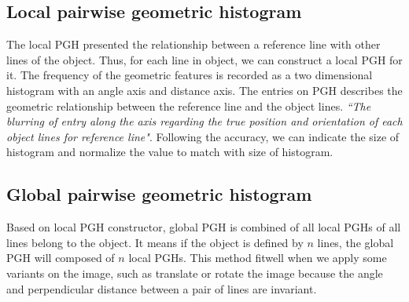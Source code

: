 \subsection{Local pairwise geometric histogram}
The local PGH presented the relationship between a reference line with other lines of the object. Thus, for each line in object, we can construct a local PGH for it. The frequency of the geometric features is recorded as a two dimensional histogram with an angle axis and distance axis. The entries on PGH describes the geometric relationship between the reference line and the object lines. \textit{``The blurring of entry along the axis regarding the true position and orientation of each object lines for reference line"}\cite{palaniswamy2010automatic}. Following the accuracy, we can indicate the size of histogram and normalize the value to match with size of histogram.
\subsection{Global pairwise geometric histogram}
Based on local PGH constructor, global PGH is combined of all local PGHs of all lines belong to the object. It means if the object is defined by $n$ lines, the global PGH will composed of $n$ local PGHs. This method fitwell when we apply some variants on the image, such as translate or rotate the image because the angle and perpendicular distance between a pair of lines are invariant.

